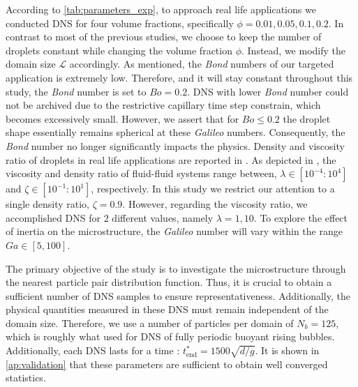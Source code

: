 According to \ref{tab:parameters_exp}, to approach real life applications we conducted DNS for four volume fractions, specifically $\phi = 0.01,0.05,0.1,0.2$.
In contrast to most of the previous studies, we choose to keep the number of droplets constant while changing the volume fraction $\phi$. 
Instead, we modify the domain size $\mathcal{L}$ accordingly. 
As mentioned, the \textit{Bond} numbers of our targeted application is extremely low.
Therefore, and it will stay constant throughout this study, the \textit{Bond} number is set to $Bo = 0.2$.
DNS with lower \textit{Bond} number could not be archived due to the restrictive capillary time step constrain, which becomes excessively small. 
However, we assert that for $Bo \leq 0.2$ the droplet shape essentially remains spherical at these \textit{Galileo} numbers. 
Consequently, the \textit{Bond} number no longer significantly impacts the physics. 
Density and viscosity ratio of droplets in real life applications are reported in \citet[Figure 1.]{balla2020effect}.
As depicted in \citet[Figure 1.]{balla2020effect}, the viscosity and density ratio of fluid-fluid systems range between, $\lambda \in [10^{-4} : 10^4]$ and $\zeta \in [10^{-1} : 10^1]$, respectively. 
In this study we restrict our attention to a single density ratio, $\zeta = 0.9$.
However, regarding the viscosity ratio, we accomplished DNS for 2 different values, namely $\lambda = 1,10$.
To explore the effect of inertia on the microstructure, the \textit{Galileo} number will vary within the range $Ga \in [5,100]$.

The primary objective of the study is to investigate the microstructure through the nearest particle pair distribution function.
Thus, it is crucial to obtain a sufficient number of DNS samples to ensure representativeness. 
Additionally, the physical quantities measured in these DNS must remain independent of the domain size. 
Therefore, we use a number of particles per domain of $N_b = 125$, which is roughly what \citet{hidman2023assessing} used for DNS of fully periodic buoyant rising bubbles.
Additionally, each DNS lasts for a time : $t^*_\text{end} = 1500 \sqrt{d/g}$.
It is shown in \ref{ap:validation} that these parameters  are sufficient to obtain well converged statistics.  

